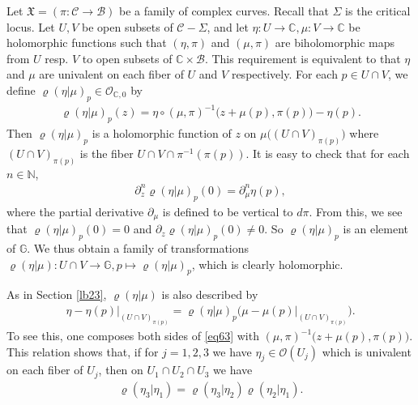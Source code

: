 \documentclass[12pt,a4paper,notitlepage]{report}
\theoremstyle{definition}
\theoremstyle{plain}
\newcommand{\fk}{\mathfrak}
\newcommand{\mc}{\mathcal}
\newcommand{\scr}{\mathscr}
\newcommand{\Gbb}{\mathbb G}
\newcommand{\Cbb}{\mathbb C}
\newcommand{\Nbb}{\mathbb N}
\numberwithin{equation}{section}
\begin{document}
Let $\fk X=(\pi:\mc C\rightarrow\mc B)$ be a family of complex curves. Recall that $\Sigma$ is the critical locus. Let $U,V$ be open subsets of $\mc C-\Sigma$, and let $\eta:U\rightarrow\Cbb,\mu:V\rightarrow\Cbb$ be holomorphic functions such that $(\eta,\pi)$ and $(\mu,\pi)$ are biholomorphic maps from $U$ resp. $V$ to open subsets of $\Cbb\times\mc B$. This requirement is equivalent to that $\eta$ and $\mu$ are univalent on each fiber of $U$ and $V$ respectively.  For each $p\in U\cap V$, we define $\varrho(\eta|\mu)_p\in\scr O_{\Cbb,0}$ by
\begin{align}
\varrho(\eta|\mu)_p(z)=\eta\circ(\mu,\pi)^{-1}\big(z+\mu(p),\pi(p)\big)-\eta(p).\label{eq62}
\end{align}
Then $\varrho(\eta|\mu)_p$ is a holomorphic function of $z$ on  $\mu\big((U\cap V)_{\pi(p)}\big)$ where $(U\cap V)_{\pi(p)}$ is the fiber $U\cap V\cap \pi^{-1}(\pi(p))$. It is easy to check that for each $n\in\Nbb$,
\begin{align}
\partial_z^n\varrho(\eta|\mu)_p(0)=\partial_\mu^n \eta(p)\label{eq226},
\end{align}
where the partial derivative $\partial_\mu$ is defined to be vertical to $d\pi$. From this, we see that $\varrho(\eta|\mu)_p(0)=0$ and  $\partial_z\varrho(\eta|\mu)_p(0)\neq0$. So $\varrho(\eta|\mu)_p$ is an element of $\Gbb$. We thus obtain a family of transformations $\varrho(\eta|\mu):U\cap V\rightarrow\Gbb,p\mapsto \varrho(\eta|\mu)_p$, which  is clearly holomorphic.

As in Section \ref{lb23}, $\varrho(\eta|\mu)$ is also described by
\begin{align}
\eta-\eta(p)\big|_{(U\cap V)_{\pi(p)}}=\varrho(\eta|\mu)_p\big(\mu-\mu(p)\big|_{(U\cap V)_{\pi(p)}}\big).\label{eq63}
\end{align}
To see this, one composes both sides of \eqref{eq63} with $(\mu,\pi)^{-1}\big(z+\mu(p),\pi(p)\big)$. This relation shows that,   if for $j=1,2,3$ we have $\eta_j\in\scr O(U_j)$ which is univalent on each fiber of $U_j$, then  on $U_1\cap U_2\cap U_3$ we have
\begin{align}
\varrho(\eta_3|\eta_1)=\varrho(\eta_3|\eta_2)\varrho(\eta_2|\eta_1).
\end{align}


\end{document}
